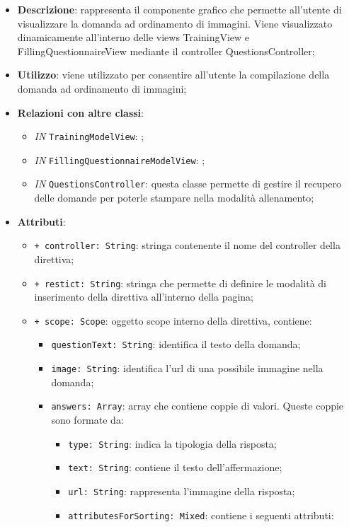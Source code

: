 		\begin{itemize}
			\item \textbf{Descrizione}: rappresenta il componente grafico che permette all'utente di visualizzare la domanda ad ordinamento di immagini. Viene visualizzato dinamicamente all'interno delle views TrainingView e FillingQuestionnaireView mediante il controller QuestionsController;
			\item \textbf{Utilizzo}: viene utilizzato per consentire all'utente la compilazione della domanda ad ordinamento di immagini;
			\item \textbf{Relazioni con altre classi}: 
			\begin{itemize}
				\item \textit{IN} \texttt{TrainingModelView}: ; 
				\item \textit{IN} \texttt{FillingQuestionnaireModelView}: ;
				\item \textit{IN} \texttt{QuestionsController}: questa classe permette di gestire il recupero delle domande per poterle stampare nella modalità allenamento;
			\end{itemize}
			\item \textbf{Attributi}: 
			\begin{itemize}
				\item \texttt{+ controller: String}: stringa contenente il nome del controller della direttiva;
				\item \texttt{+ restict: String}: stringa che permette di definire le modalità di inserimento della direttiva all'interno della pagina;
				\item \texttt{+ scope: Scope}: oggetto scope interno della direttiva, contiene:
				\begin{itemize}
					\item \texttt{questionText: String}: identifica il testo della domanda;
					\item \texttt{image: String}: identifica l'url di una possibile immagine nella domanda;
					\item \texttt{answers: Array}: array che contiene coppie di valori. Queste coppie sono formate da:
					\begin{itemize}
						\item \texttt{type: String}: indica la tipologia della risposta;
						\item \texttt{text: String}: contiene il testo dell'affermazione;
						\item \texttt{url: String}: rappresenta l'immagine della risposta;
						\item \texttt{attributesForSorting: Mixed}: contiene i seguenti attributi:

\end{itemize}
\end{itemize}
\end{itemize}
\end{itemize}
